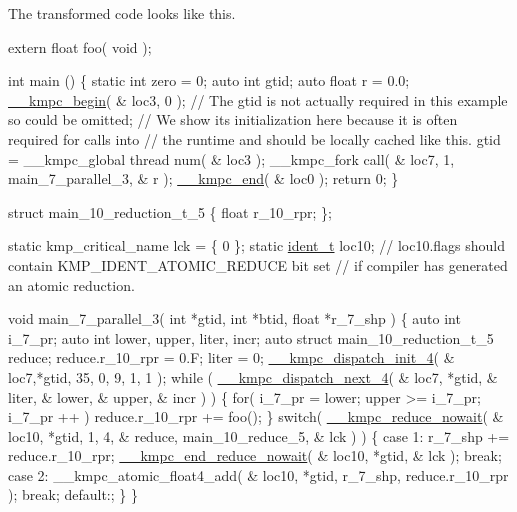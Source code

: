 The transformed code looks like this. 
\begin{DoxyCode}
\textcolor{keyword}{extern} \textcolor{keywordtype}{float} foo( \textcolor{keywordtype}{void} ); 

\textcolor{keywordtype}{int} main () \{
    \textcolor{keyword}{static} \textcolor{keywordtype}{int} zero = 0; 
    \textcolor{keyword}{auto} \textcolor{keywordtype}{int} gtid; 
    \textcolor{keyword}{auto} \textcolor{keywordtype}{float} r = 0.0; 
    \hyperlink{group__STARTUP__SHUTDOWN_ga53f4ef16321f42eeb3b8dd463b51f112}{\_\_kmpc\_begin}( & loc3, 0 ); 
    \textcolor{comment}{// The gtid is not actually required in this example so could be omitted;}
    \textcolor{comment}{// We show its initialization here because it is often required for calls into}
    \textcolor{comment}{// the runtime and should be locally cached like this.}
    gtid = \_\_kmpc\_global thread num( & loc3 ); 
    \_\_kmpc\_fork call( & loc7, 1, main\_7\_parallel\_3, & r ); 
    \hyperlink{group__STARTUP__SHUTDOWN_gacdedfb2c01fe256ad6c75507644bdfed}{\_\_kmpc\_end}( & loc0 ); 
    \textcolor{keywordflow}{return} 0; 
\}

\textcolor{keyword}{struct }main\_10\_reduction\_t\_5 \{ \textcolor{keywordtype}{float} r\_10\_rpr; \}; 

\textcolor{keyword}{static} kmp\_critical\_name lck = \{ 0 \};
\textcolor{keyword}{static} \hyperlink{structident}{ident\_t} loc10; \textcolor{comment}{// loc10.flags should contain KMP\_IDENT\_ATOMIC\_REDUCE bit set }
                      \textcolor{comment}{// if compiler has generated an atomic reduction.}

\textcolor{keywordtype}{void} main\_7\_parallel\_3( \textcolor{keywordtype}{int} *gtid, \textcolor{keywordtype}{int} *btid, \textcolor{keywordtype}{float} *r\_7\_shp ) \{
    \textcolor{keyword}{auto} \textcolor{keywordtype}{int} i\_7\_pr; 
    \textcolor{keyword}{auto} \textcolor{keywordtype}{int} lower, upper, liter, incr; 
    \textcolor{keyword}{auto} \textcolor{keyword}{struct }main\_10\_reduction\_t\_5 reduce; 
    reduce.r\_10\_rpr = 0.F; 
    liter = 0; 
    \hyperlink{group__WORK__SHARING_gae991c61cbe8e2942fe1f757a65442b26}{\_\_kmpc\_dispatch\_init\_4}( & loc7,*gtid, 35, 0, 9, 1, 1 ); 
    \textcolor{keywordflow}{while} ( \hyperlink{group__WORK__SHARING_ga5671ff45051907f76cc3d214e1de854b}{\_\_kmpc\_dispatch\_next\_4}( & loc7, *gtid, & liter, & lower, & upper, & incr 
      ) ) \{
        \textcolor{keywordflow}{for}( i\_7\_pr = lower; upper >= i\_7\_pr; i\_7\_pr ++ ) 
          reduce.r\_10\_rpr += foo(); 
    \}
    \textcolor{keywordflow}{switch}( \hyperlink{group__SYNCHRONIZATION_gafc5438d4c4f01dcd347d9bfde27f68e1}{\_\_kmpc\_reduce\_nowait}( & loc10, *gtid, 1, 4, & reduce, main\_10\_reduce\_5, & 
      lck ) ) \{
        \textcolor{keywordflow}{case} 1:
            r\_7\_shp += reduce.r\_10\_rpr;
           \hyperlink{group__SYNCHRONIZATION_ga5c40184c6babbe35c50d43a47573c5c5}{\_\_kmpc\_end\_reduce\_nowait}( & loc10, *gtid, & lck );
           \textcolor{keywordflow}{break};
        \textcolor{keywordflow}{case} 2:
           \_\_kmpc\_atomic\_float4\_add( & loc10, *gtid, r\_7\_shp, reduce.r\_10\_rpr );
           \textcolor{keywordflow}{break};
        \textcolor{keywordflow}{default}:;
    \}
\} 


\end{DoxyCode}

